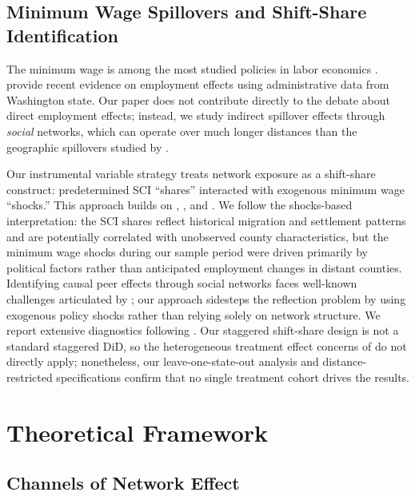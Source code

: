 \documentclass[12pt]{article}
\begin{document}
\subsection{Minimum Wage Spillovers and Shift-Share Identification}

The minimum wage is among the most studied policies in labor economics \citep{neumark2007minimum, dube2010minimum, cengiz2019effect}. \citet{jardim2024} provide recent evidence on employment effects using administrative data from Washington state. Our paper does not contribute directly to the debate about direct employment effects; instead, we study indirect spillover effects through \textit{social} networks, which can operate over much longer distances than the geographic spillovers studied by \citet{dube2014designing}.

Our instrumental variable strategy treats network exposure as a shift-share construct: predetermined SCI ``shares'' interacted with exogenous minimum wage ``shocks.'' This approach builds on \citet{bartik1991benefits}, \citet{goldsmithpinkham2020bartik}, and \citet{borusyak2022quasi}. We follow the shocks-based interpretation: the SCI shares reflect historical migration and settlement patterns and are potentially correlated with unobserved county characteristics, but the minimum wage shocks during our sample period were driven primarily by political factors rather than anticipated employment changes in distant counties. Identifying causal peer effects through social networks faces well-known challenges articulated by \citet{manski1993identification}; our approach sidesteps the reflection problem by using exogenous policy shocks rather than relying solely on network structure. We report extensive diagnostics following \citet{adao2019shift}. Our staggered shift-share design is not a standard staggered DiD, so the heterogeneous treatment effect concerns of \citet{dechaisemartin2020, dechaisemartin2024} do not directly apply; nonetheless, our leave-one-state-out analysis and distance-restricted specifications confirm that no single treatment cohort drives the results.


\section{Theoretical Framework}
\label{sec:theory}

\subsection{Channels of Network Effect}
\end{document}
